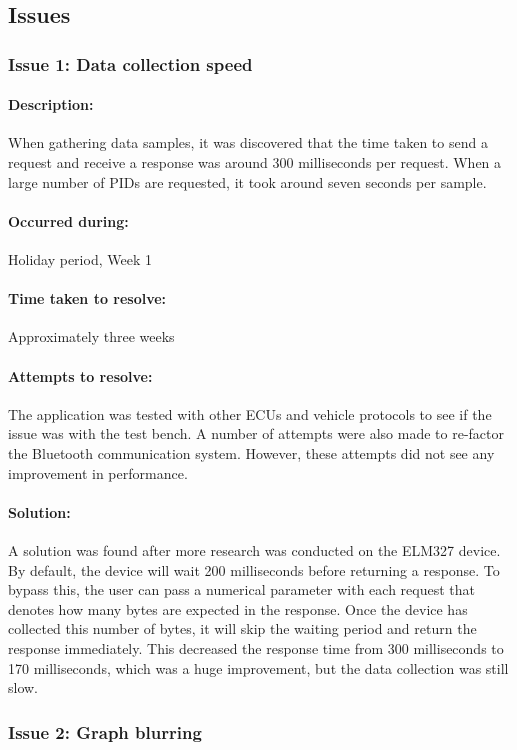 	\subsection{Issues}{		
		\subsubsection{Issue 1: Data collection speed}{
			\paragraph{Description:}
			When gathering data samples, it was discovered that the time taken to send a request and receive a response was around 300 milliseconds per request. When a large number of PIDs are requested, it took around seven seconds per sample.
			\paragraph{Occurred during:}
			Holiday period, Week 1
			\paragraph{Time taken to resolve:}
			Approximately three weeks
			\paragraph{Attempts to resolve:}
			The application was tested with other ECUs and vehicle protocols to see if the issue was with the test bench. A number of attempts were also made to re-factor the Bluetooth communication system. However, these attempts did not see any improvement in performance.
			\paragraph{Solution:}
			A solution was found after more research was conducted on the ELM327 device. By default, the device will wait 200 milliseconds before returning a response. To bypass this, the user can pass a numerical parameter with each request that denotes how many bytes are expected in the response. Once the device has collected this number of bytes, it will skip the waiting period and return the response immediately. This decreased the response time from 300 milliseconds to 170 milliseconds, which was a huge improvement, but the data collection was still slow.
		\subsubsection{Issue 2: Graph blurring}{
}}}
